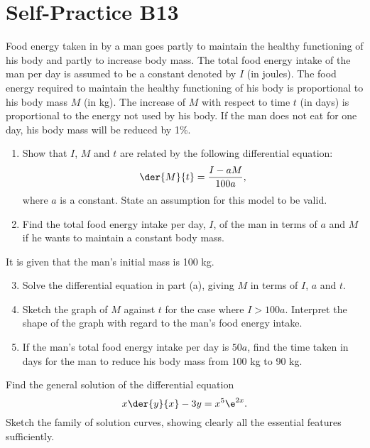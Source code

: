 \section{Self-Practice B13}

\begin{problem}
    Food energy taken in by a man goes partly to maintain the healthy functioning of his body and partly to increase body mass. The total food energy intake of the man per day is assumed to be a constant denoted by $I$ (in joules). The food energy required to maintain the healthy functioning of his body is proportional to his body mass $M$ (in kg). The increase of $M$ with respect to time $t$ (in days) is proportional to the energy not used by his body. If the man does not eat for one day, his body mass will be reduced by 1\%. 
    
    \begin{enumerate}
        \item Show that $I$, $M$ and $t$ are related by the following differential equation: \[\der{M}{t} = \frac{I - aM}{100a},\] where $a$ is a constant. State an assumption for this model to be valid.
        \item Find the total food energy intake per day, $I$, of the man in terms of $a$ and $M$ if he wants to maintain a constant body mass.
    \end{enumerate}

    It is given that the man's initial mass is 100 kg.
    
    \begin{enumerate}
        \setcounter{enumi}{2}
        \item Solve the differential equation in part (a), giving $M$ in terms of $I$, $a$ and $t$.
        \item Sketch the graph of $M$ against $t$ for the case where $I > 100a$. Interpret the shape of the graph with regard to the man's food energy intake.
        \item If the man's total food energy intake per day is $50a$, find the time taken in days for the man to reduce his body mass from 100 kg to 90 kg.
    \end{enumerate}
\end{problem}

\begin{problem}
    Find the general solution of the differential equation \[x \der{y}{x} - 3y = x^5 \e^{2x}.\] Sketch the family of solution curves, showing clearly all the essential features sufficiently.
\end{problem}

